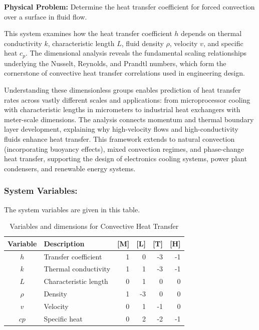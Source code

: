 \begin{problembox}
\textbf{Physical Problem:} Determine the heat transfer coefficient for forced convection over a surface in fluid flow.
\end{problembox}
\begin{codebox}
This system examines how the heat transfer coefficient $h$ depends on thermal conductivity $k$, characteristic length $L$, fluid density $\rho$, velocity $v$, and specific heat $c_p$. The dimensional analysis reveals the fundamental scaling relationships underlying the Nusselt, Reynolds, and Prandtl numbers, which form the cornerstone of convective heat transfer correlations used in engineering design.

Understanding these dimensionless groups enables prediction of heat transfer rates across vastly different scales and applications: from microprocessor cooling with characteristic lengths in micrometers to industrial heat exchangers with meter-scale dimensions. The analysis connects momentum and thermal boundary layer development, explaining why high-velocity flows and high-conductivity fluids enhance heat transfer. This framework extends to natural convection (incorporating buoyancy effects), mixed convection regimes, and phase-change heat transfer, supporting the design of electronics cooling systems, power plant condensers, and renewable energy systems.
\end{codebox}

\subsubsection*{System Variables: } The system variables are given in this table.

\begin{table}[htpb]
\centering
\begin{tabular}{|c|l|r|r|r|r|}
\hline
\textbf{Variable} & \textbf{Description} & \textbf{[M]} & \textbf{[L]} & \textbf{[T]} & \textbf{[H]} \\
\hline
$h$ & Transfer coefficient & 1 & 0 & -3 & -1 \\
$k$ & Thermal conductivity & 1 & 1 & -3 & -1 \\
$L$ & Characteristic length & 0 & 1 & 0 & 0 \\
$\rho$ & Density & 1 & -3 & 0 & 0 \\
$v$ & Velocity & 0 & 1 & -1 & 0 \\
$cp$ & Specific heat & 0 & 2 & -2 & -1 \\
\hline
\end{tabular}
\caption{Variables and dimensions for Convective Heat Transfer}
\end{table}

